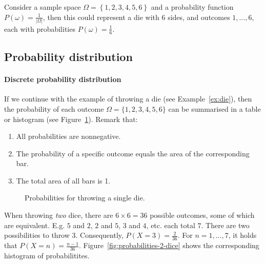 \begin{example}
  \label{ex:die}
  Consider a sample space $\Omega =  \left\{ 1,2,3,4,5,6 \right\} $ and a probability function $P(\omega) = \frac{1}{|\Omega|}$, then this could represent a die with 6 sides, and outcomes $1, \ldots, 6$, each with probabilities $P(\omega) = \frac{1}{6}$.
\end{example}

\subsection{Probability distribution}
\label{ssec:probability-distribution}

\paragraph{Discrete probability distribution}

If we continue with the example of throwing a die (see Example~\ref{ex:die}), then the probability of each outcome $\Omega = \{1,2,3,4,5,6\}$ can be summarised in a table or histogram (see Figure~\ref{fig:probabilities-1-die}). Remark that:

\begin{enumerate}
  \item All probabilities are nonnegative.
  \item The probability of a specific outcome equals the area of the corresponding bar.
  \item The total area of all bars is 1.
\end{enumerate}

\begin{figure}
  \centering
  \caption{Probabilities for throwing a single die.}
  \label{fig:probabilities-1-die}
\end{figure}

When throwing \emph{two} dice, there are $6 \times 6 = 36$ possible outcomes, some of which are equivalent. E.g. $5$ and $2$, $2$ and $5$, $3$ and $4$, etc. each total $7$. There are two possibilities to throw $3$. Consequently, $P(X=3) = \frac{2}{36}$. For $n = 1, \ldots, 7$, it holds that $P(X=n) = \frac{n-1}{36}$. Figure~\ref{fig:probabilities-2-dice} shows the corresponding histogram of probabilitites.

